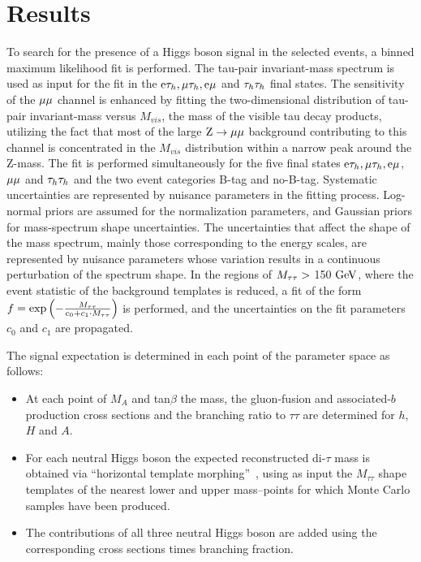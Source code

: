\section{Results}

To search for the presence of a Higgs boson signal in the selected events, a binned maximum likelihood fit is performed.
The tau-pair invariant-mass spectrum is used as input for the fit in the $\mathrm{e}\mathrm{\tau}_{h}, \mathrm{\mu}\mathrm{\tau}_{h}, \mathrm{e}\mathrm{\mu}$ and $\mathrm{\tau}_{h}\mathrm{\tau}_{h}$ final states.
The sensitivity of the $\mathrm{\mu}\mathrm{\mu}$ channel is enhanced by fitting the two-dimensional distribution of tau-pair invariant-mass versus $M_{vis}$, the mass of the visible tau decay products,
utilizing the fact that most of the large $\mathrm{Z}\to \mathrm{\mu}\mathrm{\mu}$ background contributing to this channel 
is concentrated in the $M_{vis}$ distribution within a narrow peak around the Z-mass.
The fit is performed simultaneously for the five final states $\mathrm{e}\mathrm{\tau}_{h}, \mathrm{\mu}\mathrm{\tau}_{h}, \mathrm{e}\mathrm{\mu}$, $\mathrm{\mu}\mathrm{\mu}$ and $\mathrm{\tau}_{h}\mathrm{\tau}_{h}$
and the two event categories B-tag and no-B-tag.
Systematic uncertainties are represented by nuisance parameters in the fitting process. Log-normal priors are assumed for the normalization parameters, and Gaussian priors for mass-spectrum shape uncertainties. The uncertainties that affect the shape of the mass spectrum, mainly those corresponding to the energy scales, are represented by nuisance parameters whose variation results in a continuous perturbation of the spectrum shape. 
In the regions of $M_{\mathrm{\tau}\mathrm{\tau}} >$  150 $\mathrm{GeV}$, where the event statistic of the background templates is reduced, a fit of the form $f=\exp\left(-\frac{M_{\mathrm{\tau}\mathrm{\tau}}}{c_{0}+c_1\cdot M_{\mathrm{\tau}\mathrm{\tau}}}\right)$ is performed, and the uncertainties on the fit parameters $c_{0}$ and $c_{1}$ are propagated. 

The signal expectation is determined in each point of the parameter space as follows:
\begin{itemize}
\item At each point of $M_A$ and tan$\beta$ the mass, the gluon-fusion and associated-$b$ production cross sections and the branching ratio to $\tau\tau$ are determined for $h$, $H$ and $A$.
\item For each neutral Higgs boson the expected reconstructed di-$\tau$ mass is obtained via ``horizontal template morphing''~\cite{Read:1999kh},
  using as input the $M_{\tau\tau}$ shape templates of the nearest lower and upper mass--points for which Monte Carlo samples have been produced.
\item The contributions of all three neutral Higgs boson are added using the corresponding cross sections times branching fraction. 
\end{itemize}


